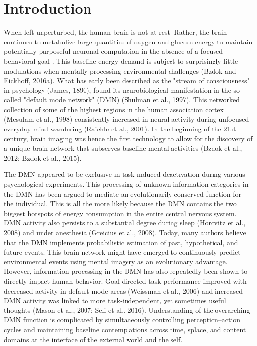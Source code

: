 \documentclass{article} %
\begin{document}
\section{Introduction}
%
When left unperturbed, the human brain is not at rest.
Rather, the brain continues to metabolize large quantities of
oxygen and glucose energy to maintain
potentially purposeful neuronal computation
in the absence of a focused behavioral goal
\citep{kenet2003spontaneously, fiser2004small}.
This baseline energy demand is subject to surprisingly little modulations
when mentally processing environmental challenges
(Bzdok and Eickhoff, 2016a).
What has early been described as the "stream of consciousness"
in psychology (James, 1890), found its neurobiological manifestation
in the so-called "default mode network" (DMN)
(Shulman et al., 1997). This networked collection of some of the highest regions in
the human association cortex (Mesulam et al., 1998) consistently
increased in neural activity during
unfocused everyday mind wandering (Raichle et al., 2001).
In the beginning of the 21st century, brain imaging was hence the first technology
to allow for the discovery of a unique brain network that subserves
baseline mental activities (Bzdok et al., 2012; Bzdok et al., 2015).



The DMN appeared to be exclusive in task-induced
deactivation during various psychological experiments.
This processing of unknown information categories in the DMN has
been argued to mediate an evolutionarily conserved function for the individual.
This is all the more likely because the DMN contains the two
biggest hotspots of energy consumption in the entire central nervous system.
DMN activity also persists to a substantial degree during
sleep (Horovitz et al., 2008) and under anesthesia (Greicius et al., 2008).
Today, many authors believe that the DMN implements
probabilistic estimation of past, hypothetical, and future events. This
brain network
might have emerged to continuously predict environmental events using
mental imagery as an evolutionary advantage.
%
However, information processing in the DMN has also repeatedly
been shown to directly impact human behavior. Goal-directed task performance
improved with decreased activity in default mode areas (Weissman et al., 2006)
and increased DMN activity was linked to more task-independent,
yet sometimes useful thoughts (Mason et al., 2007; Seli et al., 2016).
%
Understanding of the overarching DMN function is complicated by
simultaneously controlling perception–action cycles and
maintaining baseline contemplations
across time, splace, and content domains
at the interface of the external world and the self.
\end{document}
